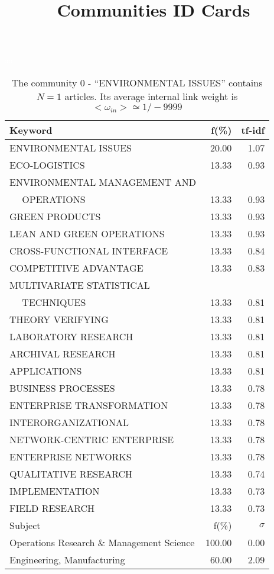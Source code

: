 \documentclass[a4paper,11pt]{report}
\title{{\bf Communities ID Cards}}
\date{\begin{flushleft}This document gather the ``ID Cards'' of the CC communities found within your database.\\
 The CC network was built by keeping a link between articles sharing at least 5 references. The communities characterized here correspond to the ones found in the level 0 (in the sense of the Louvain algo) which gathers more than 0 articles.\\
 These ID cards displays the most frequent keywords, subject categories, journals of publication, institution, countries, authors, references and reference journals of the articles of each community. The significance of an item $\sigma = \sqrt{N} (f - p) / \sqrt{p(1-p)}$ [where $N$ is the number of articles within the community and $f$ and $p$ are the proportion of articles respectively within the community and within the database displaying that item ] is also given (for example $\sigma > 5$ is really highly significant). The tf-idf value which can be calculated by $tf-idf = f*log(frac{1}{p})$ is also given.\\
\vspace{1cm}
\copyright Sebastian Grauwin, Liu Weizhi - (2014) \end{flushleft}}
\begin{document}
\begin{landscape}
\maketitle
\clearpage

\begin{table}[!ht]
\caption{The community 0 - ``ENVIRONMENTAL ISSUES'' contains $N = 1$ articles. Its average internal link weight is $<\omega_{in}> \simeq 1/-9999$ }
\textcolor{white}{aa}\\
{\scriptsize\begin{tabular}{|l r  r|}
\hline
Keyword & f(\%) & tf-idf \\
\hline
ENVIRONMENTAL ISSUES & 20.00 & 1.07\\
ECO-LOGISTICS & 13.33 & 0.93\\
ENVIRONMENTAL MANAGEMENT AND &  &\\
$\quad$ OPERATIONS & 13.33 & 0.93\\
GREEN PRODUCTS & 13.33 & 0.93\\
LEAN AND GREEN OPERATIONS & 13.33 & 0.93\\
CROSS-FUNCTIONAL INTERFACE & 13.33 & 0.84\\
COMPETITIVE ADVANTAGE & 13.33 & 0.83\\
MULTIVARIATE STATISTICAL &  &\\
$\quad$ TECHNIQUES & 13.33 & 0.81\\
THEORY VERIFYING & 13.33 & 0.81\\
LABORATORY RESEARCH & 13.33 & 0.81\\
ARCHIVAL RESEARCH & 13.33 & 0.81\\
APPLICATIONS & 13.33 & 0.81\\
BUSINESS PROCESSES & 13.33 & 0.78\\
ENTERPRISE TRANSFORMATION & 13.33 & 0.78\\
INTERORGANIZATIONAL & 13.33 & 0.78\\
NETWORK-CENTRIC ENTERPRISE & 13.33 & 0.78\\
ENTERPRISE NETWORKS & 13.33 & 0.78\\
QUALITATIVE RESEARCH & 13.33 & 0.74\\
IMPLEMENTATION & 13.33 & 0.73\\
FIELD RESEARCH & 13.33 & 0.73\\
\hline
\hline
Subject & f(\%) & $\sigma$\\
\hline
Operations Research \& Management Science & 100.00 & 0.00\\
Engineering, Manufacturing & 60.00 & 2.09\\

\end{tabular}}
\end{table}
\end{landscape}
\end{document}
